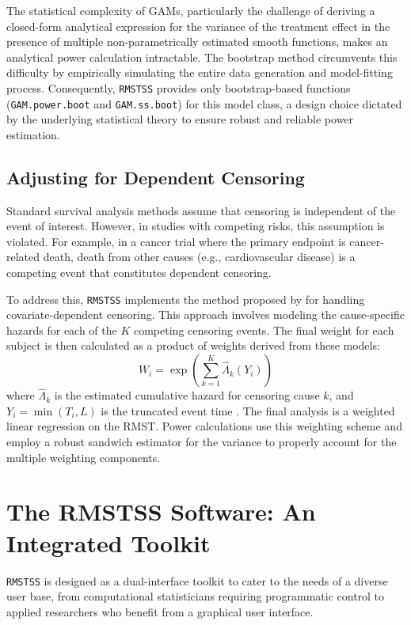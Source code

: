 \documentclass[11pt, a4paper]{article}
\begin{document}
The statistical complexity of GAMs, particularly the challenge of deriving a closed-form analytical expression for the variance of the treatment effect in the presence of multiple non-parametrically estimated smooth functions, makes an analytical power calculation intractable. The bootstrap method circumvents this difficulty by empirically simulating the entire data generation and model-fitting process. Consequently, \texttt{RMSTSS} provides only bootstrap-based functions (\texttt{GAM.power.boot} and \texttt{GAM.ss.boot}) for this model class, a design choice dictated by the underlying statistical theory to ensure robust and reliable power estimation.

\subsection{Adjusting for Dependent Censoring}
Standard survival analysis methods assume that censoring is independent of the event of interest. However, in studies with competing risks, this assumption is violated. For example, in a cancer trial where the primary endpoint is cancer-related death, death from other causes (e.g., cardiovascular disease) is a competing event that constitutes dependent censoring.

To address this, \texttt{RMSTSS} implements the method proposed by \citet{wang2018} for handling covariate-dependent censoring. This approach involves modeling the cause-specific hazards for each of the $K$ competing censoring events. The final weight for each subject is then calculated as a product of weights derived from these models:
\begin{equation}
W_i = \exp\left(\sum_{k=1}^{K} \hat{\Lambda}_{k}(Y_i)\right)
\end{equation}
where $\hat{\Lambda}_{k}$ is the estimated cumulative hazard for censoring cause $k$, and $Y_i = \min(T_i, L)$ is the truncated event time \cite{[1]}. The final analysis is a weighted linear regression on the RMST. Power calculations use this weighting scheme and employ a robust sandwich estimator for the variance to properly account for the multiple weighting components.

\section{The RMSTSS Software: An Integrated Toolkit}
\texttt{RMSTSS} is designed as a dual-interface toolkit to cater to the needs of a diverse user base, from computational statisticians requiring programmatic control to applied researchers who benefit from a graphical user interface.
\end{document}
